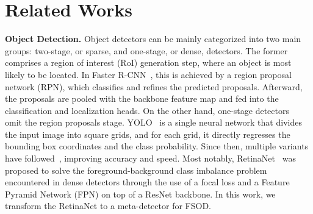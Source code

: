 \documentclass[10pt,twocolumn,letterpaper]{article}
\begin{document}
\section{Related Works}

\textbf{Object Detection.} Object detectors can be mainly categorized into two main groups: two-stage, or sparse, and one-stage, or dense, detectors. The former~\cite{R-CNN, FastR-CNN, FasterR-CNN} comprises a region of interest (RoI) generation step, where an object is most likely to be located. In Faster R-CNN~\cite{FasterR-CNN}, this is achieved by a region proposal network
(RPN), which classifies and refines the predicted proposals. Afterward, the proposals are pooled with the backbone feature map and fed into the classification and localization heads. On the other hand, one-stage detectors~\cite{YOLOv1,SSD, YOLOv2, RetinaNet, YOLOv3, YOLOv4, EfficientDet} omit the region proposals stage. YOLO~\cite{YOLOv1} is a single neural network that divides the input image into square grids, and for each grid, it directly regresses the bounding box coordinates and the class probability. Since then, multiple variants have followed~\cite{YOLOv2, YOLOv3, YOLOv4}, improving accuracy and speed. Most notably, RetinaNet~\cite{RetinaNet} was proposed to solve the foreground-background class imbalance problem encountered in dense detectors through the use of a focal loss and a Feature Pyramid Network (FPN) \cite{fpn} on top of a ResNet backbone. In this work, we transform the RetinaNet to a meta-detector for FSOD.  
\end{document}
